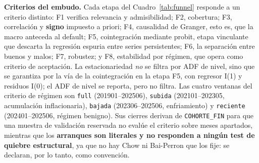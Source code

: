 \documentclass[12pt, a4paper]{article}
\begin{document}
\noindent\textbf{Criterios del embudo.} Cada etapa del Cuadro~\ref{tab:funnel} responde a un
criterio distinto: F1 verifica relevancia y admisibilidad; F2, cobertura; F3, correlación y
\textbf{signo} impuesto a priori; F4, causalidad de Granger, esto es, que la macro anteceda al
default; F5, cointegración mediante probit, etapa vinculante que descarta la regresión espuria entre
series persistentes; F6, la separación entre buenos y malos; F7, robustez; y F8, estabilidad por
régimen, que opera como criterio de aceptación. La estacionariedad \emph{no} se filtra por ADF de
nivel, sino que se garantiza por la vía de la cointegración en la etapa F5, con regresor I(1) y
residuos I(0); el ADF de nivel se reporta, pero no filtra. Las cuatro ventanas del criterio de
régimen son \texttt{full} (201901--202506), \texttt{subida} (202101--202305, acumulación
inflacionaria), \texttt{bajada} (202306--202506, enfriamiento) y \texttt{reciente} (202401--202506,
régimen benigno). Sus cierres derivan de \texttt{COHORTE\_FIN} para que una muestra de validación
reservada no evalúe el criterio sobre meses apartados, mientras que los \textbf{arranques son
literales y no responden a ningún test de quiebre estructural}, ya que no hay Chow ni Bai-Perron que
los fije: se declaran, por lo tanto, como convención.
\end{document}
